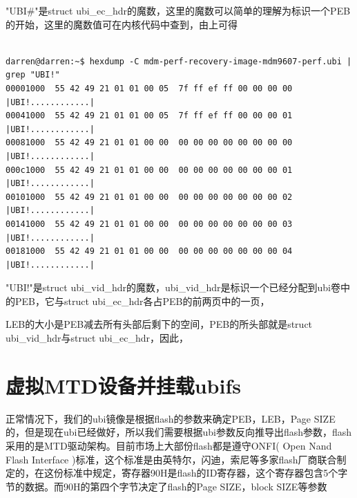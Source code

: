 "UBI\#"是struct ubi\_ec\_hdr的魔数，这里的魔数可以简单的理解为标识一个PEB的开始，这里的魔数值可在内核代码中查到，由上可得
\begin{mdframed}[backgroundcolor=lightgray,hidealllines=true]
\begin{verbatim}

darren@darren:~$ hexdump -C mdm-perf-recovery-image-mdm9607-perf.ubi | grep "UBI!"
00001000  55 42 49 21 01 01 00 05  7f ff ef ff 00 00 00 00  |UBI!............|
00041000  55 42 49 21 01 01 00 05  7f ff ef ff 00 00 00 01  |UBI!............|
00081000  55 42 49 21 01 01 00 00  00 00 00 00 00 00 00 00  |UBI!............|
000c1000  55 42 49 21 01 01 00 00  00 00 00 00 00 00 00 01  |UBI!............|
00101000  55 42 49 21 01 01 00 00  00 00 00 00 00 00 00 02  |UBI!............|
00141000  55 42 49 21 01 01 00 00  00 00 00 00 00 00 00 03  |UBI!............|
00181000  55 42 49 21 01 01 00 00  00 00 00 00 00 00 00 04  |UBI!............|

\end{verbatim}
\end{mdframed}

"UBI!"是struct ubi\_vid\_hdr的魔数，ubi\_vid\_hdr是标识一个已经分配到ubi卷中的PEB，它与struct ubi\_ec\_hdr各占PEB的前两页中的一页，

LEB的大小是PEB减去所有头部后剩下的空间，PEB的所头部就是struct ubi\_vid\_hdr与struct ubi\_ec\_hdr，因此，

\section{虚拟MTD设备并挂载ubifs}
正常情况下，我们的ubi镜像是根据flash的参数来确定PEB，LEB，Page SIZE的，但是现在ubi已经做好，所以我们需要根据ubi参数反向推导出flash参数，flash采用的是MTD驱动架构。目前市场上大部份flash都是遵守ONFI( Open Nand Flash Interface )标准，这个标准是由英特尔，闪迪，索尼等多家flash厂商联合制定的，在这份标准中规定，寄存器90H是flash的ID寄存器，这个寄存器包含5个字节的数据。而90H的第四个字节决定了flash的Page SIZE，block SIZE等参数

